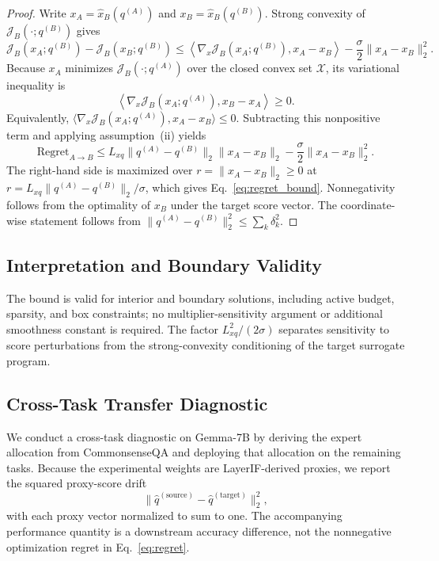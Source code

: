 \documentclass[accepted]{uai2026}%
\theoremstyle{remark}%
\begin{document}
\begin{proof}
Write $x_A=\widehat x_B(q^{(A)})$ and
$x_B=\widehat x_B(q^{(B)})$. Strong convexity of
$\mathcal J_B(\cdot;q^{(B)})$ gives
\begin{equation*}
\mathcal J_B(x_A;q^{(B)})-\mathcal J_B(x_B;q^{(B)})
\le
\left\langle\nabla_x\mathcal J_B(x_A;q^{(B)}),x_A-x_B\right\rangle
-\frac{\sigma}{2}\|x_A-x_B\|_2^2.
\end{equation*}
Because $x_A$ minimizes $\mathcal J_B(\cdot;q^{(A)})$ over the closed
convex set $\mathcal X$, its variational inequality is
\[
\left\langle\nabla_x\mathcal J_B(x_A;q^{(A)}),x_B-x_A\right\rangle\ge0.
\]
Equivalently,
$\langle\nabla_x\mathcal J_B(x_A;q^{(A)}),x_A-x_B\rangle\le0$.
Subtracting this nonpositive term and applying assumption~(ii) yields
\begin{equation*}
\mathrm{Regret}_{A\to B}
\le
L_{xq}\|q^{(A)}-q^{(B)}\|_2\|x_A-x_B\|_2
-\frac{\sigma}{2}\|x_A-x_B\|_2^2.
\end{equation*}
The right-hand side is maximized over
$r=\|x_A-x_B\|_2\ge0$ at
$r=L_{xq}\|q^{(A)}-q^{(B)}\|_2/\sigma$, which gives
Eq.~\eqref{eq:regret_bound}. Nonnegativity follows from the optimality of
$x_B$ under the target score vector. The coordinate-wise statement follows
from $\|q^{(A)}-q^{(B)}\|_2^2\le\sum_k\delta_k^2$.
\end{proof}

\subsection{Interpretation and Boundary Validity}
The bound is valid for interior and boundary solutions,
including active budget, sparsity, and box constraints; no multiplier-sensitivity
argument or additional smoothness constant is required. The factor
$L_{xq}^2/(2\sigma)$ separates sensitivity to score perturbations from the
strong-convexity conditioning of the target surrogate program.


\subsection{Cross-Task Transfer Diagnostic}
We conduct a cross-task diagnostic on Gemma-7B by deriving
the expert allocation from CommonsenseQA and deploying that allocation on the
remaining tasks. Because the experimental weights are LayerIF-derived proxies,
we report the squared proxy-score drift
\[
\|\widehat q^{(\mathrm{source})}-\widehat q^{(\mathrm{target})}\|_2^2,
\]
with each proxy vector normalized to sum to one. The accompanying performance
quantity is a downstream accuracy difference, not the nonnegative optimization
regret in Eq.~\eqref{eq:regret}.
    
\end{document}
